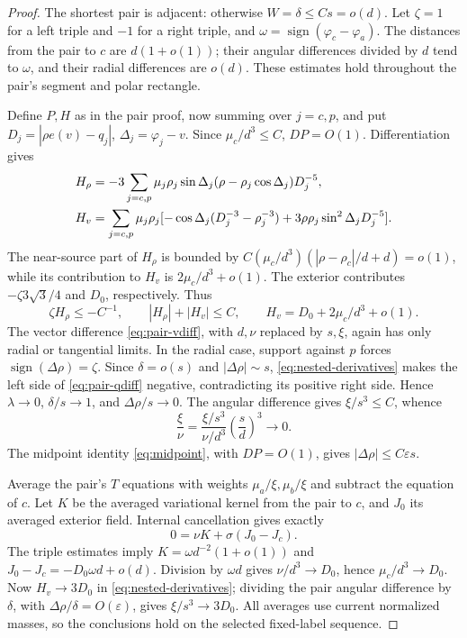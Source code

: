 \documentclass[11pt,a4paper]{article}
\numberwithin{equation}{section}
\theoremstyle{remark}
\newcommand{\eps}{\varepsilon}
\begin{document}
\begin{proof}
The shortest pair is adjacent: otherwise $W=\delta\le Cs=o(d)$. Let $\zeta=1$ for a left triple and $-1$ for a right triple, and $\omega=\operatorname{sign}(\varphi_c-\varphi_a)$. The distances from the pair to $c$ are $d(1+o(1))$; their angular differences divided by $d$ tend to $\omega$, and their radial differences are $o(d)$. These estimates hold throughout the pair's segment and polar rectangle.

Define $P,H$ as in the pair proof, now summing over $j=c,p$, and put $D_j=|\rho e(v)-q_j|$, $\Delta_j=\varphi_j-v$. Since $\mu_c/d^3\le C$, $DP=O(1)$. Differentiation gives
\begin{align}
 H_\rho&=-3\sum_{j=c,p}\mu_j\rho_j\sin\Delta_j(\rho-\rho_j\cos\Delta_j)D_j^{-5},\label{eq:nested-field}\\
 H_v&=\sum_{j=c,p}\mu_j\rho_j[-\cos\Delta_j(D_j^{-3}-\rho_j^{-3})+3\rho\rho_j\sin^2\Delta_jD_j^{-5}].\notag
\end{align}
The near-source part of $H_\rho$ is bounded by
$C(\mu_c/d^3)(|\rho-\rho_c|/d+d)=o(1)$, while its contribution to $H_v$ is $2\mu_c/d^3+o(1)$. The exterior contributes $-\zeta3\sqrt3/4$ and $D_0$, respectively. Thus
\begin{equation}\label{eq:nested-derivatives}
 \zeta H_\rho\le-C^{-1},\qquad |H_\rho|+|H_v|\le C,
 \qquad H_v=D_0+2\mu_c/d^3+o(1).
\end{equation}
The vector difference \eqref{eq:pair-vdiff}, with $d,\nu$ replaced by $s,\xi$, again has only radial or tangential limits. In the radial case, support against $p$ forces $\operatorname{sign}(\Delta\rho)=\zeta$. Since $\delta=o(s)$ and $|\Delta\rho|\sim s$, \eqref{eq:nested-derivatives} makes the left side of \eqref{eq:pair-qdiff} negative, contradicting its positive right side. Hence $\lambda\to0$, $\delta/s\to1$, and $\Delta\rho/s\to0$. The angular difference gives $\xi/s^3\le C$, whence
\[
 \frac\xi\nu=\frac{\xi/s^3}{\nu/d^3}\left(\frac sd\right)^3\to0.
\]
The midpoint identity \eqref{eq:midpoint}, with $DP=O(1)$, gives $|\Delta\rho|\le C\eps s$.

Average the pair's $T$ equations with weights $\mu_a/\xi,\mu_b/\xi$ and subtract the equation of $c$. Let $K$ be the averaged variational kernel from the pair to $c$, and $J_0$ its averaged exterior field. Internal cancellation gives exactly
\begin{equation}\label{eq:nested-macro-average}
 0=\nu K+\sigma(J_0-J_c).
\end{equation}
The triple estimates imply $K=\omega d^{-2}(1+o(1))$ and $J_0-J_c=-D_0\omega d+o(d)$. Division by $\omega d$ gives $\nu/d^3\to D_0$, hence $\mu_c/d^3\to D_0$. Now $H_v\to3D_0$ in \eqref{eq:nested-derivatives}; dividing the pair angular difference by $\delta$, with $\Delta\rho/\delta=O(\eps)$, gives $\xi/s^3\to3D_0$. All averages use current normalized masses, so the conclusions hold on the selected fixed-label sequence.
\end{proof}
\end{document}
